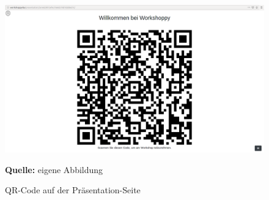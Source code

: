 \begin{figure}[H]
  \begin{center}
    \includegraphics[scale=0.2]{img/qrcode}
	\caption{QR-Code auf der Präsentation-Seite} 
	\footnotesize\sffamily\textbf{Quelle:} eigene Abbildung
	\label{fig:präsentation-seite mit qrcode final}
  \end{center}   
\end{figure}






